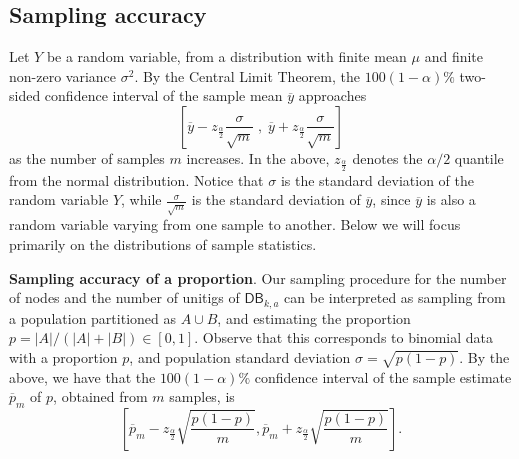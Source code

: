 \documentclass[a4paper,11pt]{article}
\newcommand{\alex}[1]{{\color{blue}{#1}}}
\newcommand{\DB}{\mathsf{DB}_{k,a}}
\begin{document}








\subsection{Sampling accuracy}

Let $Y$ be a random variable, from a distribution with finite mean $\mu$ and finite non-zero variance $\sigma^2$. By the Central Limit Theorem, the $100(1-\alpha)\%$ two-sided confidence interval of the sample mean $\overline{y}$ approaches 
\[\left[\overline{y} - z_{\frac{\alpha}{2}}\frac{\sigma}{\sqrt{m}} \;, \; \overline{y} + z_{\frac{\alpha}{2}}\frac{\sigma}{\sqrt{m}}\right] \]
as the number of samples $m$ increases. In the above, $z_{\frac{\alpha}{2}}$ denotes the $\alpha/2$ quantile from the normal distribution. Notice that $\sigma$ is the standard deviation of the random variable $Y$, while $\frac{\sigma}{\sqrt{m}}$ is the standard deviation of $\overline{y}$, since $\overline{y}$ is also a random variable varying from one sample to another. Below we will focus primarily on the distributions of sample statistics.

\medskip
\noindent\textbf{Sampling accuracy of a proportion}. Our sampling procedure for the number of nodes and the number of unitigs of $\DB$ can be interpreted as sampling from a population partitioned as $A \cup B$, and estimating the proportion $p = |A| / (|A| + |B|) \in [0,1]$. Observe that this corresponds to binomial data with a proportion $p$, and population standard deviation $\sigma = \sqrt{p(1-p)}$. By the above, we have that the $100(1-\alpha)\%$ confidence interval of the sample estimate $\overline{p}_m$ of $p$, obtained from $m$ samples, is
\[\left[\overline{p}_m - z_{\frac{\alpha}{2}}\sqrt{\frac{p(1-p)}{m}} , \overline{p}_m + z_{\frac{\alpha}{2}}\sqrt{\frac{p(1-p)}{m}}\right]. \]
\end{document}
